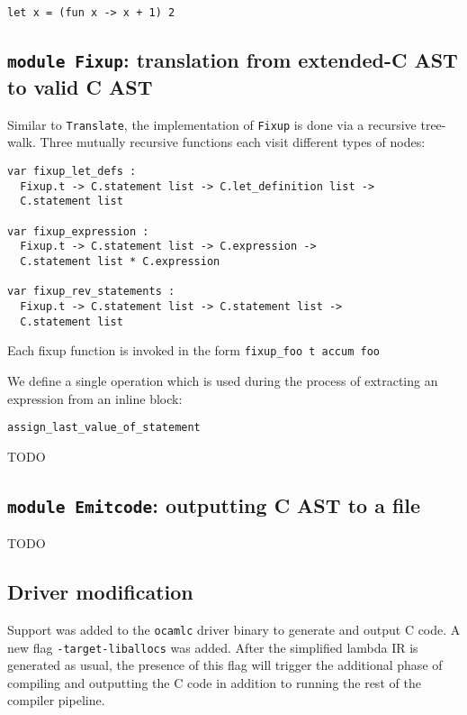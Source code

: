 \documentclass[12pt,a4paper,twoside,openright]{report}
\begin{document}
\begin{lstlisting}
let x = (fun x -> x + 1) 2
\end{lstlisting}

\subsection{\texttt{module Fixup}: translation from extended-C AST to valid C AST}\label{module-fixup}

Similar to \lstinline!Translate!, the implementation of \lstinline!Fixup! is
done via a recursive tree-walk. Three mutually recursive functions each visit
different types of nodes:

\begin{lstlisting}
var fixup_let_defs :
  Fixup.t -> C.statement list -> C.let_definition list ->
  C.statement list

var fixup_expression :
  Fixup.t -> C.statement list -> C.expression ->
  C.statement list * C.expression

var fixup_rev_statements :
  Fixup.t -> C.statement list -> C.statement list ->
  C.statement list
\end{lstlisting}

Each fixup function is invoked in the form \lstinline!fixup_foo t accum foo!

We define a single operation which is used during the process of extracting an
expression from an inline block:

\begin{lstlisting}
assign_last_value_of_statement
\end{lstlisting}

TODO

\subsection{\texttt{module Emitcode}: outputting C AST to a file}\label{emitcode}

TODO

\subsection{Driver modification}

Support was added to the \lstinline!ocamlc! driver binary to generate and
output C code. A new flag \lstinline!-target-liballocs! was added. After the
simplified lambda IR is generated as usual, the presence of this flag will
trigger the additional phase of compiling and outputting the C code in addition
to running the rest of the compiler pipeline.
\end{document}
